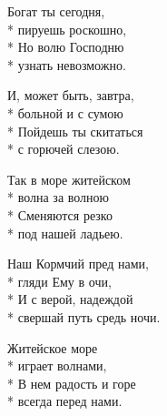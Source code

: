 \medskip

\begin{minipage}{\linewidth}
Богат ты сегодня,\\*
пируешь роскошно,\\*
Но волю Господню\\*
узнать невозможно.\\
\end{minipage}\par\medskip\nobreak

\medskip

\begin{minipage}{\linewidth}
И, может быть, завтра,\\*
больной и с сумою\\*
Пойдешь ты скитаться\\*
с горючей слезою.\\
\end{minipage}\par\medskip\nobreak

\medskip

\begin{minipage}{\linewidth}
Так в море житейском\\*
волна за волною\\*
Сменяются резко\\*
под нашей ладьею.\\
\end{minipage}\par\medskip\nobreak

\medskip

\begin{minipage}{\linewidth}
Наш Кормчий пред нами,\\*
гляди Ему в очи,\\*
И с верой, надеждой\\*
свершай путь средь ночи.\\
\end{minipage}\par\medskip\nobreak

\medskip

\begin{minipage}{\linewidth}
Житейское море\\*
играет волнами,\\*
В нем радость и горе\\*
всегда перед нами.\\
\end{minipage}

\vspace{\fill}\newpage

